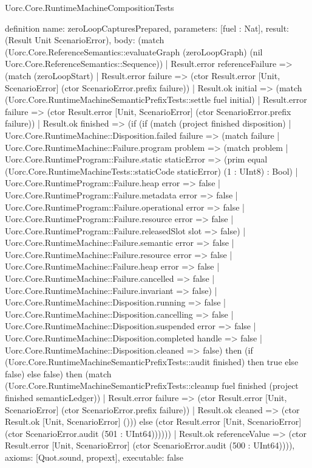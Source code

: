 \begin{lexlean}{Uorc.Core.RuntimeMachineCompositionTests}
\begin{semanticmodule}
definition{
  name: zeroLoopCapturesPrepared,
  parameters: [fuel : Nat],
  result: (Result Unit ScenarioError),
  body: (match (Uorc.Core.ReferenceSemantics::evaluateGraph (zeroLoopGraph) (nil Uorc.Core.ReferenceSemantics::Sequence))
    | Result.error referenceFailure => (match (zeroLoopStart)
      | Result.error failure => (ctor Result.error [Unit, ScenarioError] (ctor ScenarioError.prefix failure))
      | Result.ok initial => (match (Uorc.Core.RuntimeMachineSemanticPrefixTests::settle fuel initial)
        | Result.error failure => (ctor Result.error [Unit, ScenarioError] (ctor ScenarioError.prefix failure))
        | Result.ok finished => (if (if (match (project finished disposition)
          | Uorc.Core.RuntimeMachine::Disposition.failed failure => (match failure
            | Uorc.Core.RuntimeMachine::Failure.program problem => (match problem
              | Uorc.Core.RuntimeProgram::Failure.static staticError => (prim equal (Uorc.Core.RuntimeMachineTests::staticCode staticError) (1 : UInt8) : Bool)
              | Uorc.Core.RuntimeProgram::Failure.heap error => false
              | Uorc.Core.RuntimeProgram::Failure.metadata error => false
              | Uorc.Core.RuntimeProgram::Failure.operational error => false
              | Uorc.Core.RuntimeProgram::Failure.resource error => false
              | Uorc.Core.RuntimeProgram::Failure.releasedSlot slot => false)
            | Uorc.Core.RuntimeMachine::Failure.semantic error => false
            | Uorc.Core.RuntimeMachine::Failure.resource error => false
            | Uorc.Core.RuntimeMachine::Failure.heap error => false
            | Uorc.Core.RuntimeMachine::Failure.cancelled => false
            | Uorc.Core.RuntimeMachine::Failure.invariant => false)
          | Uorc.Core.RuntimeMachine::Disposition.running => false
          | Uorc.Core.RuntimeMachine::Disposition.cancelling => false
          | Uorc.Core.RuntimeMachine::Disposition.suspended error => false
          | Uorc.Core.RuntimeMachine::Disposition.completed handle => false
          | Uorc.Core.RuntimeMachine::Disposition.cleaned => false) then (if (Uorc.Core.RuntimeMachineSemanticPrefixTests::audit finished) then true else false) else false) then (match (Uorc.Core.RuntimeMachineSemanticPrefixTests::cleanup fuel finished (project finished semanticLedger))
          | Result.error failure => (ctor Result.error [Unit, ScenarioError] (ctor ScenarioError.prefix failure))
          | Result.ok cleaned => (ctor Result.ok [Unit, ScenarioError] ())) else (ctor Result.error [Unit, ScenarioError] (ctor ScenarioError.audit (501 : UInt64))))))
    | Result.ok referenceValue => (ctor Result.error [Unit, ScenarioError] (ctor ScenarioError.audit (500 : UInt64)))),
  axioms: [Quot.sound, propext],
  executable: false
}


\end{semanticmodule}
\end{lexlean}
